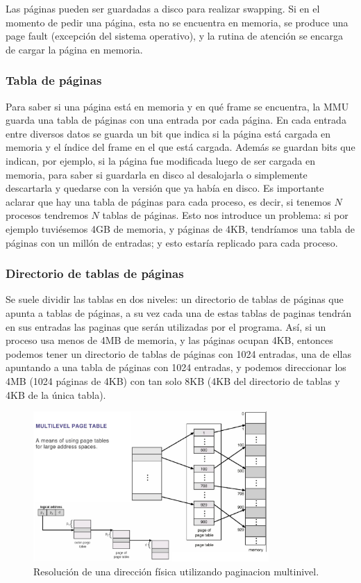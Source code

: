 \documentclass{article}
\begin{document}
Las páginas pueden ser guardadas a disco para realizar swapping. Si en el momento de pedir una p\'agina, esta no se encuentra en memoria, se produce una page fault (excepci\'on del sistema operativo), y la rutina de atenci\'on se encarga de cargar la p\'agina en memoria. 

\subsubsection{Tabla de páginas}
Para saber si una p\'agina est\'a en memoria y en qu\'e frame se encuentra, la MMU guarda una tabla de p\'aginas con una entrada por cada p\'agina. En cada entrada entre diversos datos se guarda un bit que indica si la p\'agina est\'a cargada en memoria y el \'indice del frame en el que est\'a cargada. Adem\'as se guardan bits que indican, por ejemplo, si la p\'agina fue modificada luego de ser cargada en memoria, para saber si guardarla en disco al desalojarla o simplemente descartarla y quedarse con la versi\'on que ya hab\'ia en disco. Es importante aclarar que hay una tabla de p\'aginas para cada proceso, es decir, si tenemos $N$ procesos tendremos $N$ tablas de p\'aginas. Esto nos introduce un problema: si por ejemplo tuviésemos 4GB de memoria, y p\'aginas de 4KB, tendr\'iamos una tabla de p\'aginas con un mill\'on de entradas; y esto estaría replicado para cada proceso. 

\subsubsection{Directorio de tablas de páginas}
Se suele dividir las tablas en dos niveles: un directorio de tablas de p\'aginas que apunta a tablas de p\'aginas, a su vez cada una de estas tablas de paginas tendrán en sus entradas las paginas que serán utilizadas por el programa. As\'i, si un proceso usa menos de 4MB de memoria, y las p\'aginas ocupan 4KB, entonces podemos tener un directorio de tablas de p\'aginas con 1024 entradas, una de ellas apuntando a una tabla de p\'aginas con 1024 entradas, y podemos direccionar los 4MB (1024 p\'aginas de 4KB) con tan solo 8KB (4KB del directorio de tablas y 4KB de la \'unica tabla).

\begin{figure}[H]
    \centering
    \includegraphics[width=0.8\textwidth]{imgs/memory_multi_level_paging.png}
    \caption{Resolución de una dirección física utilizando paginacion multinivel.}
    \label{fig:memory_multi_level_paging}
\end{figure}
\end{document}
